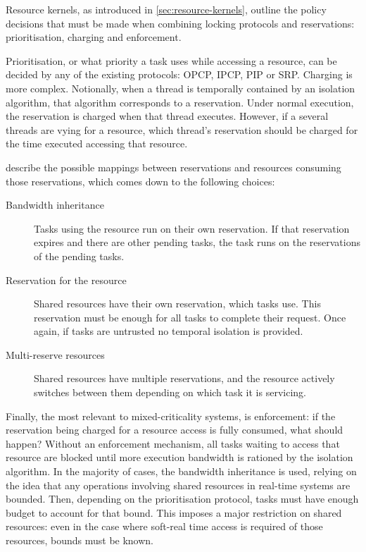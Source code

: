 Resource kernels, as introduced in \cref{sec:resource-kernels}, outline the policy decisions that
must be made when combining locking protocols and reservations: prioritisation, charging and
enforcement. 

Prioritisation, or what priority a task uses while accessing a resource, can be decided by any of
the existing protocols: \gls{OPCP}, \gls{IPCP}, \gls{PIP} or \gls{SRP}. Charging is more complex.
Notionally, when a thread is temporally contained by an isolation algorithm, that algorithm
corresponds to a reservation. Under normal execution, the reservation is charged when that thread
executes. However, if a several threads are vying for a resource, which thread's reservation should
be charged for the time executed accessing that resource.

 describe the possible mappings
between reservations and resources consuming those reservations, which comes down to the following
choices:

\begin{description}
\item[Bandwidth inheritance] Tasks using the resource run on their own reservation.  If that
    reservation expires and there are other pending tasks, the task runs on the reservations of the
    pending tasks. 
\item[Reservation for the resource] Shared resources have their own reservation, which tasks use.
    This reservation must be enough for all tasks to complete their request.  Once again, if tasks
    are untrusted no temporal isolation is provided. 
\item[Multi-reserve resources] Shared resources have multiple reservations, and the resource
    actively switches between them depending on which task it is servicing. 
\end{description} 

Finally, the most relevant to mixed-criticality systems, is enforcement: if the reservation being
charged for a resource access is fully consumed, what should happen? Without an enforcement
mechanism, all tasks waiting to access that resource are blocked until more execution bandwidth is
rationed by the isolation algorithm. In the majority of cases, the bandwidth inheritance is used,
relying on the idea that any operations involving shared resources in real-time systems are bounded.
Then, depending on the prioritisation protocol, tasks must have enough budget to account for that
bound. This imposes a major restriction on shared resources: even in the case where soft-real time
access is required of those resources, bounds must be known.

